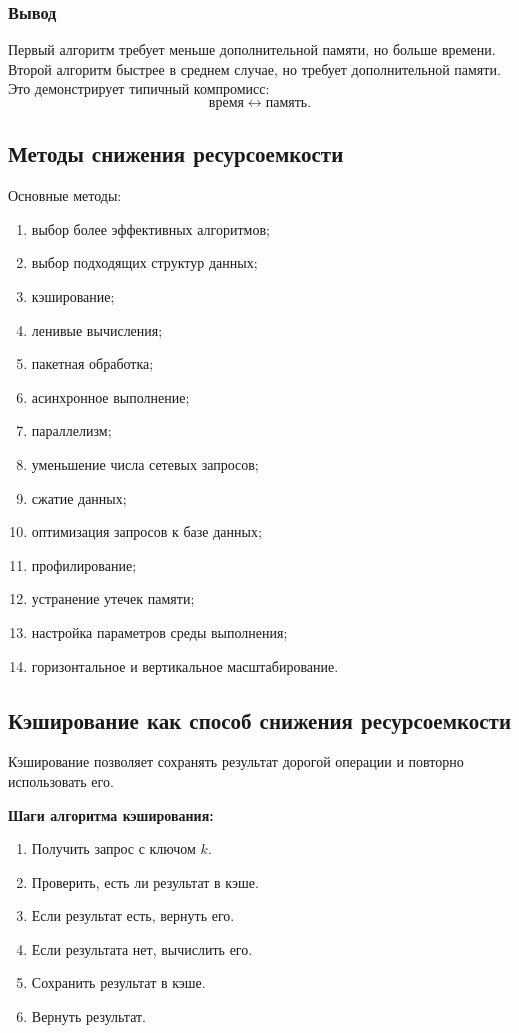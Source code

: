 \documentclass[12pt,a4paper]{article}
\begin{document}
\subsubsection{Вывод}

Первый алгоритм требует меньше дополнительной памяти, но больше времени. Второй алгоритм быстрее в среднем случае, но требует дополнительной памяти. Это демонстрирует типичный компромисс:
\[
\text{время} \leftrightarrow \text{память}.
\]

\subsection{Методы снижения ресурсоемкости}

Основные методы:
\begin{enumerate}
    \item выбор более эффективных алгоритмов;
    \item выбор подходящих структур данных;
    \item кэширование;
    \item ленивые вычисления;
    \item пакетная обработка;
    \item асинхронное выполнение;
    \item параллелизм;
    \item уменьшение числа сетевых запросов;
    \item сжатие данных;
    \item оптимизация запросов к базе данных;
    \item профилирование;
    \item устранение утечек памяти;
    \item настройка параметров среды выполнения;
    \item горизонтальное и вертикальное масштабирование.
\end{enumerate}

\subsection{Кэширование как способ снижения ресурсоемкости}

Кэширование позволяет сохранять результат дорогой операции и повторно использовать его.

\textbf{Шаги алгоритма кэширования:}
\begin{enumerate}
    \item Получить запрос с ключом $k$.
    \item Проверить, есть ли результат в кэше.
    \item Если результат есть, вернуть его.
    \item Если результата нет, вычислить его.
    \item Сохранить результат в кэше.
    \item Вернуть результат.
\end{enumerate}
\end{document}
